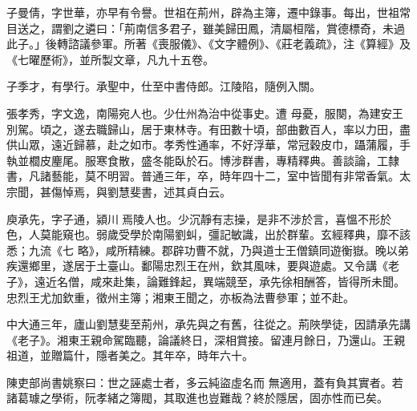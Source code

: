 \begin{pinyinscope}
 子曼倩，字世華，亦早有令譽。世祖在荊州，辟為主簿，遷中錄事。每出，世祖常目送之，謂劉之遴曰：「荊南信多君子，雖美歸田鳳，清屬桓階，賞德標奇，未過此子。」後轉諮議參軍。所著《喪服儀》、《文字體例》、《莊老義疏》，注《算經》及《七曜歷術》，並所製文章，凡九十五卷。



 子季才，有學行。承聖中，仕至中書侍郎。江陵陷，隨例入關。



 張孝秀，字文逸，南陽宛人也。少仕州為治中從事史。遭
 母憂，服闋，為建安王別駕。頃之，遂去職歸山，居于東林寺。有田數十頃，部曲數百人，率以力田，盡供山眾，遠近歸慕，赴之如市。孝秀性通率，不好浮華，常冠穀皮巾，躡蒲履，手執並櫚皮麈尾。服寒食散，盛冬能臥於石。博涉群書，專精釋典。善談論，工隸書，凡諸藝能，莫不明習。普通三年，卒，時年四十二，室中皆聞有非常香氣。太宗聞，甚傷悼焉，與劉慧斐書，述其貞白云。



 庾承先，字子通，潁川焉陵人也。少沉靜有志操，是非不涉於言，喜慍不形於色，人莫能窺也。弱歲受學於南陽劉虯，彊記敏識，出於群輩。玄經釋典，靡不該悉；九流《七
 略》，咸所精練。郡辟功曹不就，乃與道士王僧鎮同遊衡嶽。晚以弟疾還鄉里，遂居于土臺山。鄱陽忠烈王在州，欽其風味，要與遊處。又令講《老子》，遠近名僧，咸來赴集，論難鋒起，異端競至，承先徐相酬答，皆得所未聞。忠烈王尤加欽重，徵州主簿；湘東王聞之，亦板為法曹參軍；並不赴。



 中大通三年，廬山劉慧斐至荊州，承先與之有舊，往從之。荊陜學徒，因請承先講《老子》。湘東王親命駕臨聽，論議終日，深相賞接。留連月餘日，乃還山。王親祖道，並贈篇什，隱者美之。其年卒，時年六十。



 陳吏部尚書姚察曰：世之誣處士者，多云純盜虛名而
 無適用，蓋有負其實者。若諸葛璩之學術，阮孝緒之簿閥，其取進也豈難哉？終於隱居，固亦性而已矣。



\end{pinyinscope}